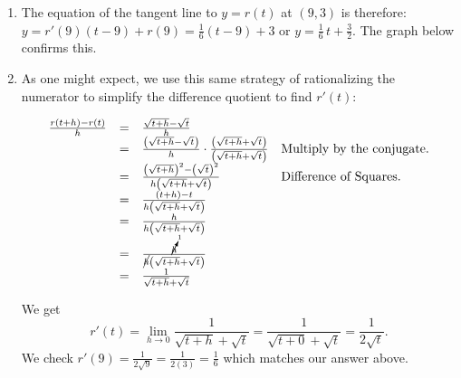 \documentclass{ximera}
\begin{document}
\begin{example}
\begin{explanation}
\begin{enumerate}
\begin{enumerate}
Hence, \[ r'(9) = \lim_{h \rightarrow 0} \frac{1}{\sqrt{9+h} +3} = \frac{1}{\sqrt{9+0} +3} = \frac{1}{6}.\]

\item  The equation of the tangent line to $y = r(t)$ at $(9,3)$ is therefore:  $y = r'(9)(t-9) + r(9) = \frac{1}{6} (t-9) + 3$ or $y = \frac{1}{6} \, t + \frac{3}{2}$. The graph below confirms this.

 \begin{center}
 \end{center}

\item As one might expect, we use this same strategy of rationalizing the numerator to simplify the difference quotient to find $r'(t)$:

\[ \begin{array}{rcll}  

 \frac{r(t+h) - r(t)}{h} & = &  \frac{\sqrt{t+h} - \sqrt{t}}{h} & \\  
												
	 & = &  \frac{\left(\sqrt{t+h} - \sqrt{t}\right)}{h} \cdot  \frac{\left(\sqrt{t+h} + \sqrt{t}\right)}{\left(\sqrt{t+h} + \sqrt{t}\right)} & \text{Multiply by the conjugate.} \\  
										
    & = &   \frac{\left(\sqrt{t+h}\right)^2 - \left(\sqrt{t}\right)^2}{h\left(\sqrt{t+h} + \sqrt{t}\right)} & \text{Difference of Squares.}\\  
												
	& = &   \frac{(t+h) - t}{h\left(\sqrt{t+h} + \sqrt{t}\right)} & \\  
												
	 & = &   \frac{h}{h\left(\sqrt{t+h} + \sqrt{t}\right)} & \\  

& = &   \frac{\cancelto{1}{h}}{\cancel{h}\left(\sqrt{t+h} + \sqrt{t}\right)} & \\  

& = &   \frac{1}{\sqrt{t+h} + \sqrt{t}} & \\ \end{array}\]	


We get \[r'(t) =  \lim_{h \rightarrow 0} \frac{1}{\sqrt{t+h} + \sqrt{t}} = \frac{1}{\sqrt{t+0} + \sqrt{t}}  = \frac{1}{2 \sqrt{t}}.\]   We check $r'(9) = \frac{1}{2\sqrt{9}} = \frac{1}{2(3)} = \frac{1}{6}$ which matches our answer above.  

\end{enumerate}

\end{enumerate}

\end{explanation}
\end{example}





\closegraphsfile
\end{document}
